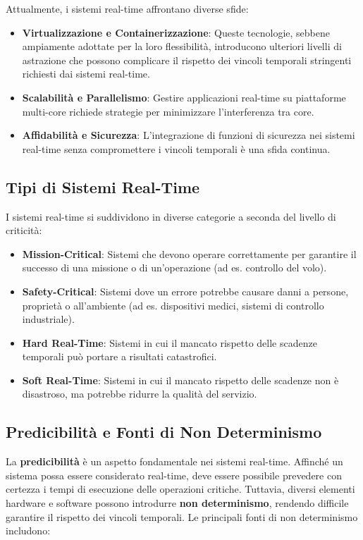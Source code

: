 \documentclass[11pt,a4paper]{report}
\begin{document}
Attualmente, i sistemi real-time affrontano diverse sfide:
\begin{itemize}
    \item \textbf{Virtualizzazione e Containerizzazione}: Queste tecnologie, sebbene ampiamente adottate per la loro flessibilità, introducono ulteriori livelli di astrazione che possono complicare il rispetto dei vincoli temporali stringenti richiesti dai sistemi real-time.
    \item \textbf{Scalabilità e Parallelismo}: Gestire applicazioni real-time su piattaforme multi-core richiede strategie per minimizzare l'interferenza tra core.
    \item \textbf{Affidabilità e Sicurezza}: L'integrazione di funzioni di sicurezza nei sistemi real-time senza compromettere i vincoli temporali è una sfida continua.
\end{itemize}

\subsection{Tipi di Sistemi Real-Time}

I sistemi real-time si suddividono in diverse categorie a seconda del livello di criticità:
\begin{itemize}
    \item \textbf{Mission-Critical}: Sistemi che devono operare correttamente per garantire il successo di una missione o di un'operazione (ad es. controllo del volo).
    \item \textbf{Safety-Critical}: Sistemi dove un errore potrebbe causare danni a persone, proprietà o all'ambiente (ad es. dispositivi medici, sistemi di controllo industriale).
    \item \textbf{Hard Real-Time}: Sistemi in cui il mancato rispetto delle scadenze temporali può portare a risultati catastrofici.
    \item \textbf{Soft Real-Time}: Sistemi in cui il mancato rispetto delle scadenze non è disastroso, ma potrebbe ridurre la qualità del servizio.
\end{itemize}

\subsection{Predicibilità e Fonti di Non Determinismo}

La \textbf{predicibilità} è un aspetto fondamentale nei sistemi real-time. Affinché un sistema possa essere considerato real-time, deve essere possibile prevedere con certezza i tempi di esecuzione delle operazioni critiche. Tuttavia, diversi elementi hardware e software possono introdurre \textbf{non determinismo}, rendendo difficile garantire il rispetto dei vincoli temporali. Le principali fonti di non determinismo includono:
\end{document}
